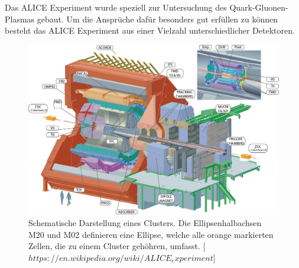 Das ALICE Experiment wurde speziell zur Untersuchung des Quark-Gluonen-Plasmas gebaut.
Um die Anspr\"uche daf\"ur besonders gut erf\"ullen zu k\"onnen besteht das ALICE Experiment aus einer Vielzahl unterschiedlicher Detektoren.
\begin{figure}[thp]
\centering
\includegraphics[width=.9\linewidth]{ALICE.jpg}
\caption{Schematische Darstellung eines Clusters. Die Ellipsenhalbachsen M20 und M02 definieren eine Ellipse, welche alle orange markierten Zellen, die zu einem Cluster geh\"ohren, umfasst.
[$https://en.wikipedia.org/wiki/ALICE_experiment]$}
\label{fig:ALICE}
\end{figure}